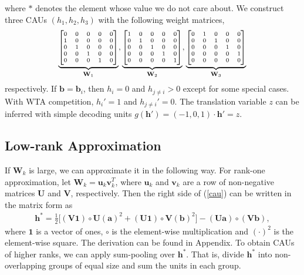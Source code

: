 \documentclass[conference]{IEEEtran}
\begin{document}
where $*$ denotes the element whose value we do not care about. We construct three CAUs $(h_1, h_2, h_3)$ with the following weight matrices,
\begin{align}
\underbrace{
  \scriptsize{
  \begin{bmatrix}
   0 & 0 & 0 & 0 & 0 \\
   1 & 0 & 0 & 0 & 0 \\
   0 & 1 & 0 & 0 & 0 \\
   0 & 0 & 1 & 0 & 0 \\        
   0 & 0 & 0 & 1 & 0 \\ 
  \end{bmatrix}}
}_{\mathbf{W}_1},
\underbrace{
  \scriptsize{
  \begin{bmatrix}
   1 & 0 & 0 & 0 & 0 \\
   0 & 1 & 0 & 0 & 0 \\
   0 & 0 & 1 & 0 & 0 \\        
   0 & 0 & 0 & 1 & 0 \\    
   0 & 0 & 0 & 0 & 1        
  \end{bmatrix}}
}_{\mathbf{W}_2},
\underbrace{
  \scriptsize{
  \begin{bmatrix}  
   0 & 1 & 0 & 0 & 0 \\
   0 & 0 & 1 & 0 & 0 \\        
   0 & 0 & 0 & 1 & 0 \\    
   0 & 0 & 0 & 0 & 1 \\
   0 & 0 & 0 & 0 & 0
  \end{bmatrix}}
}_{\mathbf{W}_3}
\label{A_non_circular}
\end{align}
respectively.
If $\mathbf{b}=\mathbf{b}_i$, then $h_i = 0$ and $h_{j\neq i}>0$ except for some special cases.  With WTA competition, $h_i'=1$ and $h_{j\neq i}'=0$. The translation variable $z$ can be inferred with simple decoding units $g(\mathbf{h}') = (-1,0,1) \cdot \mathbf{h}'= z$.


\subsection{Low-rank Approximation} \label{low-rank}

If $\mathbf{W}_k$ is large, we can approximate it in the following way.
For rank-one approximation, let
$\mathbf{W}_k = \mathbf{u}_{k}\mathbf{v}_{k}^T$, 
where $\mathbf{u}_{k}$ and $\mathbf{v}_{k}$ are a row of non-negative matrices $\mathbf{U}$ and $\mathbf{V}$, respectively. Then the right side of (\ref{cau}) can be written in the matrix form as
\begin{align} \mathbf{h}^* = 
\frac{1}{2}\Big[
(\mathbf{V}\mathbf{1}) \circ \mathbf{U}(\mathbf{a})^2 + (\mathbf{U}\mathbf{1}) \circ \mathbf{V}(\mathbf{b})^2\Big]  -  (\mathbf{U}\mathbf{a}) \circ (\mathbf{V} \mathbf{b}),
\label{rank_one}
\end{align}
where $\mathbf{1}$ is a vector of ones, $\circ$ is the element-wise multiplication and $(\cdot)^2$ is the element-wise square. The derivation can be found in Appendix. To obtain CAUs of higher ranks, we can apply sum-pooling over $\mathbf{h}^*$. That is, divide $\mathbf{h}^*$ into non-overlapping groups of equal size and sum the units in each group.
\end{document}
